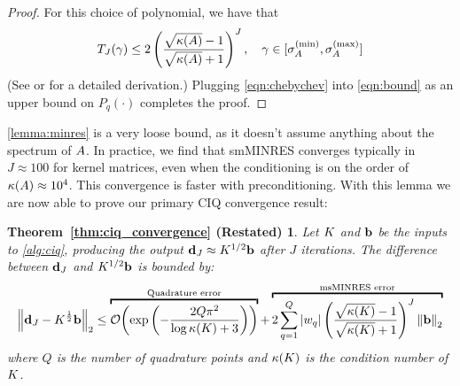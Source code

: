 \begin{proof}
  For this choice of polynomial, we have that
  \begin{equation}
    T_J( \gamma )
    \leq 2 \left( \frac{
      \sqrt{\kappa(A)} - 1
    }{
      \sqrt{\kappa(A)} + 1
    }\right)^J,
    \quad
    \gamma \in [\sigma^{(\min)}_{A}, \sigma^{(\max)}_{A}]
    \label{eqn:chebychev}
  \end{equation}
  (See \citep[e.g.][Sec. 9.2]{shewchuk1994introduction} or \citep[e.g.][Thm. 38.5]{trefethen1997numerical} for a detailed derivation.)
  Plugging \cref{eqn:chebychev} into \cref{eqn:bound} as an upper bound on $P_q(\cdot)$ completes the proof.
\end{proof}

\cref{lemma:minres} is a very loose bound, as it doesn't assume anything about the spectrum of $A$.
In practice, we find that smMINRES converges typically in $J \approx 100$ for kernel matrices, even when the conditioning is on the order of $\kappa(A) \approx 10^4$.
This convergence is faster with preconditioning.
With this lemma we are now able to prove our primary CIQ convergence result:
%
\newtheorem*{thm:ciq_convergence}{Theorem~\ref{thm:ciq_convergence} (Restated)}
\begin{thm:ciq_convergence}
  Let $K$ and $\mathbf{b}$ be the inputs to \cref{alg:ciq}, producing the output $\mathbf{d}_J \approx K^{1/2} \mathbf{b}$ after $J$ iterations.
  The difference between $\mathbf{d}_J$ and $K^{1/2} \mathbf{b}$ is bounded by:
  \begin{equation*}
    \left\Vert \bd_J - \bK^{\frac 1 2} \bb \right\Vert_2
    \leq
    \overbracket{
      \bigo{\exp\left( -\frac{2 Q \pi^2}{\log \kappa(\bK) + 3} \right)}
    }^{\text{Quadrature error}}
    +
    \overbracket{
      2 \sum_{q=1}^Q \left\vert w_q \right\vert
      \left( \frac{ \sqrt{\kappa(\bK)} - 1}{ \sqrt{\kappa(\bK)} + 1} \right)^J
      \left\Vert \bb \right\Vert_2
    }^{\text{msMINRES error}}
  \end{equation*}
  where $Q$ is the number of quadrature points and $\kappa(K)$ is the condition number of $K$.
\end{thm:ciq_convergence}
%
